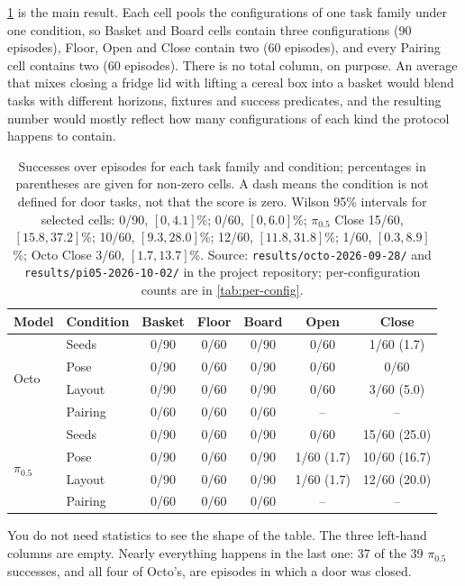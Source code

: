 \ref{tab:main-results} is the main result. Each cell pools the configurations of one task family under one condition, so Basket and Board cells contain three configurations (90 episodes), Floor, Open and Close contain two (60 episodes), and every Pairing cell contains two (60 episodes). There is no total column, on purpose. An average that mixes closing a fridge lid with lifting a cereal box into a basket would blend tasks with different horizons, fixtures and success predicates, and the resulting number would mostly reflect how many configurations of each kind the protocol happens to contain.

{\renewcommand{\arraystretch}{1.15}
\begin{table}[H]
\centering
\small
\begin{tabular}{llccccc}
\toprule
Model & Condition & Basket & Floor & Board & Open & Close \\
\midrule
\multirow{4}{*}{Octo}
 & Seeds   & 0/90 & 0/60 & 0/90 & 0/60 & 1/60 (1.7) \\
 & Pose    & 0/90 & 0/60 & 0/90 & 0/60 & 0/60 \\
 & Layout  & 0/90 & 0/60 & 0/90 & 0/60 & 3/60 (5.0) \\
 & Pairing & 0/60 & 0/60 & 0/60 & --   & -- \\
\midrule
\multirow{4}{*}{$\pi_{0.5}$}
 & Seeds   & 0/90 & 0/60 & 0/90 & 0/60       & 15/60 (25.0) \\
 & Pose    & 0/90 & 0/60 & 0/90 & 1/60 (1.7) & 10/60 (16.7) \\
 & Layout  & 0/90 & 0/60 & 0/90 & 1/60 (1.7) & 12/60 (20.0) \\
 & Pairing & 0/60 & 0/60 & 0/60 & --         & -- \\
\bottomrule
\end{tabular}
\caption{Successes over episodes for each task family and condition; percentages in parentheses are given for non-zero cells. A dash means the condition is not defined for door tasks, not that the score is zero. Wilson 95\% intervals for selected cells: 0/90, $[0, 4.1]$\%; 0/60, $[0, 6.0]$\%; $\pi_{0.5}$ Close 15/60, $[15.8, 37.2]$\%; 10/60, $[9.3, 28.0]$\%; 12/60, $[11.8, 31.8]$\%; 1/60, $[0.3, 8.9]$\%; Octo Close 3/60, $[1.7, 13.7]$\%. Source: \texttt{results/octo-2026-09-28/} and \texttt{results/pi05-2026-10-02/} in the project repository; per-configuration counts are in \ref{tab:per-config}.}
\label{tab:main-results}
\end{table}}

You do not need statistics to see the shape of the table. The three left-hand columns are empty. Nearly everything happens in the last one: 37 of the 39 $\pi_{0.5}$ successes, and all four of Octo's, are episodes in which a door was closed.

